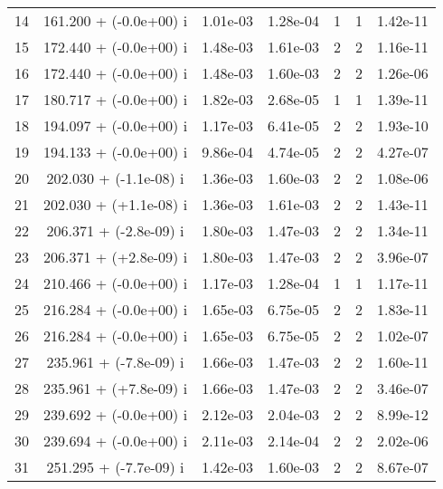 \begin{table}[H]
\begin{center}
\begin{tabular}{|c|c|c|c|c|c|c|}
    14  &    161.200 + (-0.0e+00) i  &    1.01e-03      &   1.28e-04    &   1    &  1   &    1.42e-11 \\
    15  &    172.440 + (-0.0e+00) i  &    1.48e-03      &   1.61e-03    &   2    &  2   &    1.16e-11 \\
    16  &    172.440 + (-0.0e+00) i  &    1.48e-03      &   1.60e-03    &   2    &  2   &    1.26e-06 \\
    17  &    180.717 + (-0.0e+00) i  &    1.82e-03      &   2.68e-05    &   1    &  1   &    1.39e-11 \\
    18  &    194.097 + (-0.0e+00) i  &    1.17e-03      &   6.41e-05    &   2    &  2   &    1.93e-10 \\
    19  &    194.133 + (-0.0e+00) i  &    9.86e-04      &   4.74e-05    &   2    &  2   &    4.27e-07 \\
    20  &    202.030 + (-1.1e-08) i  &    1.36e-03      &   1.60e-03    &   2    &  2   &    1.08e-06 \\
    21  &    202.030 + (+1.1e-08) i  &    1.36e-03      &   1.61e-03    &   2    &  2   &    1.43e-11 \\
    22  &    206.371 + (-2.8e-09) i  &    1.80e-03      &   1.47e-03    &   2    &  2   &    1.34e-11 \\
    23  &    206.371 + (+2.8e-09) i  &    1.80e-03      &   1.47e-03    &   2    &  2   &    3.96e-07 \\
    24  &    210.466 + (-0.0e+00) i  &    1.17e-03      &   1.28e-04    &   1    &  1   &    1.17e-11 \\
    25  &    216.284 + (-0.0e+00) i  &    1.65e-03      &   6.75e-05    &   2    &  2   &    1.83e-11 \\
    26  &    216.284 + (-0.0e+00) i  &    1.65e-03      &   6.75e-05    &   2    &  2   &    1.02e-07 \\
    27  &    235.961 + (-7.8e-09) i  &    1.66e-03      &   1.47e-03    &   2    &  2   &    1.60e-11 \\
    28  &    235.961 + (+7.8e-09) i  &    1.66e-03      &   1.47e-03    &   2    &  2   &    3.46e-07 \\
    29  &    239.692 + (-0.0e+00) i  &    2.12e-03      &   2.04e-03    &   2    &  2   &    8.99e-12 \\
    30  &    239.694 + (-0.0e+00) i  &    2.11e-03      &   2.14e-04    &   2    &  2   &    2.02e-06 \\
    31  &    251.295 + (-7.7e-09) i  &    1.42e-03      &   1.60e-03    &   2    &  2   &    8.67e-07 \\

\end{tabular}
\end{center}
\end{table}
